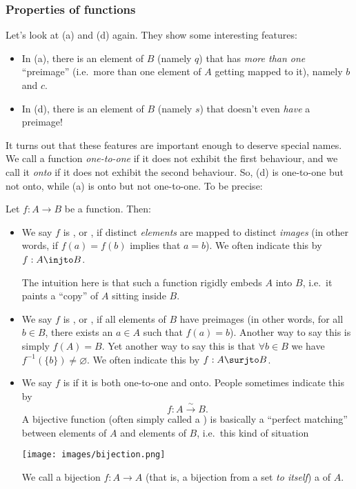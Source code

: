 \subsubsection{Properties of functions}

Let's look at (a) and (d) again. They show some interesting features:
\begin{itemize}
\item In (a), there is an element of $B$ (namely $q$) that has \emph{more than one} ``preimage'' (i.e.\ more than one element of $A$ getting mapped to it), namely $b$ and $c$.
\item In (d), there is an element of $B$ (namely $s$) that doesn't even \emph{have} a preimage!
\end{itemize}

It turns out that these features are important enough to deserve special names. We call a function \emph{one-to-one} if it does not exhibit the first behaviour, and we call it \emph{onto} if it does not exhibit the second behaviour. So, (d) is one-to-one but not onto, while (a) is onto but not one-to-one. To be precise:

\begin{definition}
Let $f : A \to B$ be a function. Then:
\begin{itemize}
\item We say $f$ is , or , if distinct \emph{elements} are mapped to distinct \emph{images} (in other words, if $f(a)=f(b)$ implies that $a=b$). We often indicate this by $f : A \injto B$.

The intuition here is that such a function rigidly embeds $A$ into $B$, i.e.\ it paints a ``copy'' of $A$ sitting inside $B$.
\item We say $f$ is , or , if all elements of $B$ have preimages (in other words, for all $b \in B$, there exists an $a \in A$ such that $f(a) = b$). Another way to say this is simply $f(A) = B$. Yet another way to say this is that $\forall b \in B$ we have $f^{-1}(\{ b \}) \neq \varnothing$. We often indicate this by $f : A \surjto B$.
\item We say $f$ is  if it is both one-to-one and onto. People sometimes indicate this by
\[ f : A \overset{\sim}{\to} B. \]
A bijective function (often simply called a ) is basically a ``perfect matching'' between elements of $A$ and elements of $B$, i.e.\ this kind of situation
\begin{center}
\texttt{[image: images/bijection.png]}
\end{center}
We call a bijection $f : A \to A$ (that is, a bijection from a set \emph{to itself}) a  of $A$.
\end{itemize}
\end{definition}


